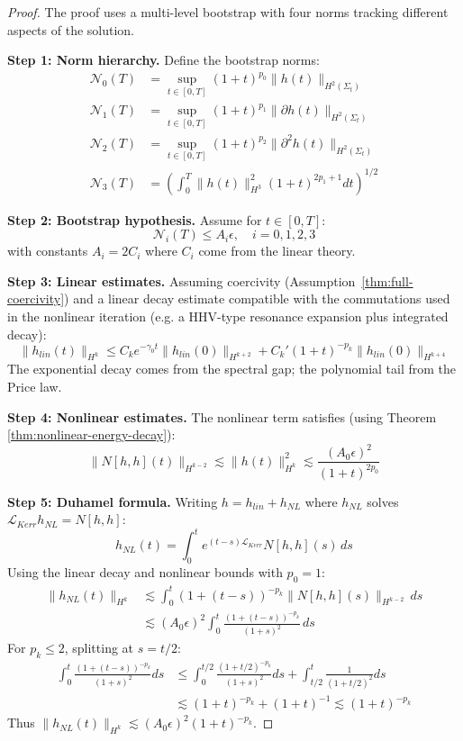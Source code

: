 \documentclass[12pt,a4paper]{article}
\begin{document}
\begin{proof}
The proof uses a multi-level bootstrap with four norms tracking different aspects of the solution.

\textbf{Step 1: Norm hierarchy.}
Define the bootstrap norms:
\begin{align}
\mathcal{N}_0(T) &= \sup_{t \in [0,T]} (1+t)^{p_0} \|h(t)\|_{H^2(\Sigma_t)} \\
\mathcal{N}_1(T) &= \sup_{t \in [0,T]} (1+t)^{p_1} \|\partial h(t)\|_{H^2(\Sigma_t)} \\
\mathcal{N}_2(T) &= \sup_{t \in [0,T]} (1+t)^{p_2} \|\partial^2 h(t)\|_{H^2(\Sigma_t)} \\
\mathcal{N}_3(T) &= \left(\int_0^T \|h(t)\|_{H^3}^2 (1+t)^{2p_1+1} dt\right)^{1/2}
\end{align}

\textbf{Step 2: Bootstrap hypothesis.}
Assume for $t \in [0, T]$:
\begin{equation}
\mathcal{N}_i(T) \leq A_i \epsilon, \quad i = 0, 1, 2, 3
\end{equation}
with constants $A_i = 2C_i$ where $C_i$ come from the linear theory.

\textbf{Step 3: Linear estimates.}
Assuming coercivity (Assumption~\ref{thm:full-coercivity}) and a linear decay estimate compatible with the commutations used in the nonlinear iteration (e.g. a HHV-type resonance expansion plus integrated decay):
\begin{equation}
\|h_{lin}(t)\|_{H^k} \leq C_k e^{-\gamma_0 t} \|h_{lin}(0)\|_{H^{k+2}} + C_k' (1+t)^{-p_k} \|h_{lin}(0)\|_{H^{k+4}}
\end{equation}
The exponential decay comes from the spectral gap; the polynomial tail from the Price law.

\textbf{Step 4: Nonlinear estimates.}
The nonlinear term satisfies (using Theorem \ref{thm:nonlinear-energy-decay}):
\begin{equation}
\|N[h, h](t)\|_{H^{k-2}} \lesssim \|h(t)\|_{H^k}^2 \lesssim \frac{(A_0 \epsilon)^2}{(1+t)^{2p_0}}
\end{equation}

\textbf{Step 5: Duhamel formula.}
Writing $h = h_{lin} + h_{NL}$ where $h_{NL}$ solves $\mathcal{L}_{Kerr} h_{NL} = N[h, h]$:
\begin{equation}
h_{NL}(t) = \int_0^t e^{(t-s)\mathcal{L}_{Kerr}} N[h, h](s) \, ds
\end{equation}
Using the linear decay and nonlinear bounds with $p_0 = 1$:
\begin{align}
\|h_{NL}(t)\|_{H^k} &\lesssim \int_0^t (1+(t-s))^{-p_k} \|N[h,h](s)\|_{H^{k-2}} \, ds \\
&\lesssim (A_0 \epsilon)^2 \int_0^t \frac{(1+(t-s))^{-p_k}}{(1+s)^{2}} \, ds
\end{align}
For $p_k \leq 2$, splitting at $s = t/2$:
\begin{align}
\int_0^t \frac{(1+(t-s))^{-p_k}}{(1+s)^{2}} ds &\leq \int_0^{t/2} \frac{(1+t/2)^{-p_k}}{(1+s)^2} ds + \int_{t/2}^t \frac{1}{(1+t/2)^2} ds \\
&\lesssim (1+t)^{-p_k} + (1+t)^{-1} \lesssim (1+t)^{-p_k}
\end{align}
Thus $\|h_{NL}(t)\|_{H^k} \lesssim (A_0\epsilon)^2 (1+t)^{-p_k}$.


\end{proof}
\end{document}
